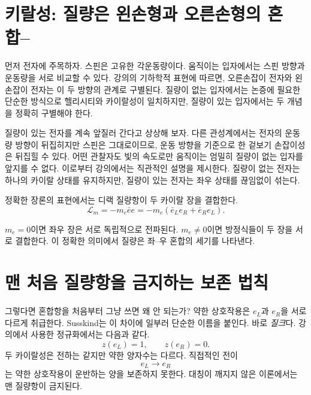 \section{키랄성: 질량은 왼손형과 오른손형의 혼합--}

먼저 전자에 주목하자. 스핀은 고유한 각운동량이다. 움직이는 입자에서는 스핀 방향과 운동량을 서로 비교할 수 있다. 강의의 기하학적 표현에 따르면, 오른손잡이 전자와 왼손잡이 전자는 이 두 방향의 관계로 구별된다. 질량이 없는 입자에서는 논증에 필요한 단순한 방식으로 헬리시티와 카이랄성이 일치하지만, 질량이 있는 입자에서는 두 개념을 정확히 구별해야 한다.

질량이 있는 전자를 계속 앞질러 간다고 상상해 보자. 다른 관성계에서는 전자의 운동량 방향이 뒤집히지만 스핀은 그대로이므로, 운동 방향을 기준으로 한 겉보기 손잡이성은 뒤집힐 수 있다. 어떤 관찰자도 빛의 속도로만 움직이는 엄밀히 질량이 없는 입자를 앞지를 수 없다. 이로부터 강의에서는 직관적인 설명을 제시한다. 질량이 없는 전자는 하나의 카이랄 상태를 유지하지만, 질량이 있는 전자는 좌우 상태를 끊임없이 섞는다.

정확한 장론의 표현에서는 디랙 질량항이 두 카이랄 장을 결합한다.
\begin{equation}
\mathcal L_m
=
-m_e\bar e e
=
-m_e
\left(
  \bar e_L e_R
  +
  \bar e_R e_L
\right).
\end{equation}

$m_e=0$이면 좌우 장은 서로 독립적으로 전파된다. $m_e\ne0$이면 방정식들이 두 장을 서로 결합한다. 이 정확한 의미에서 질량은 좌--우 혼합의 세기를 나타낸다.

\section{맨 처음 질량항을 금지하는 보존 법칙}

그렇다면 혼합항을 처음부터 그냥 쓰면 왜 안 되는가? 약한 상호작용은 $e_L$과 $e_R$을 서로 다르게 취급한다. Susskind는 이 차이에 일부러 단순한 이름을 붙인다. 바로 \emph{질크}다. 강의에서 사용한 정규화에서는 다음과 같다.
\begin{equation}
z(e_L)=1,
\qquad
z(e_R)=0.
\end{equation}
두 카이랄성은 전하는 같지만 약한 양자수는 다르다. 직접적인 전이
\begin{equation}
e_L\longrightarrow e_R
\end{equation}
는 약한 상호작용이 운반하는 양을 보존하지 못한다. 대칭이 깨지지 않은 이론에서는 맨 질량항이 금지된다.

